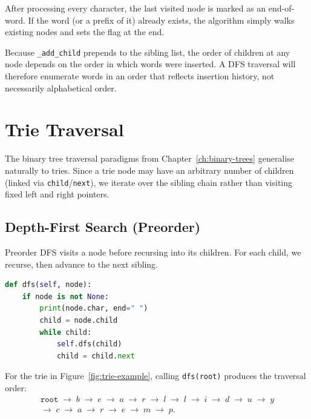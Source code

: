 \documentclass[11pt, a4paper, notitlepage]{report}
\theoremstyle{definition}
\theoremstyle{remark}
\theoremstyle{definition}
\begin{document}
After processing every character, the last visited node is marked as an
end-of-word.  If the word (or a prefix of it) already exists, the algorithm
simply walks existing nodes and sets the flag at the end.

\begin{warning}[title={Warning: Insertion Order Affects Sibling Order}]
Because \texttt{\_add\_child} prepends to the sibling list, the order of
children at any node depends on the order in which words were inserted.  A
DFS traversal will therefore enumerate words in an order that reflects
insertion history, not necessarily alphabetical order.
\end{warning}

\section{Trie Traversal}
\label{sec:trie-traversal}

The binary tree traversal paradigms from Chapter~\ref{ch:binary-trees}
generalise naturally to tries.  Since a trie node may have an arbitrary
number of children (linked via \texttt{child}/\texttt{next}), we iterate over
the sibling chain rather than visiting fixed left and right pointers.

\subsection{Depth-First Search (Preorder)}
\label{subsec:trie-dfs}

Preorder DFS visits a node before recursing into its children.  For each
child, we recurse, then advance to the next sibling.

\begin{lstlisting}[language=Python]
def dfs(self, node):
    if node is not None:
        print(node.char, end=" ")
        child = node.child
        while child:
            self.dfs(child)
            child = child.next
\end{lstlisting}

For the trie in Figure~\ref{fig:trie-example}, calling
\texttt{dfs(root)} produces the traversal order:
\begin{multline*}
  \texttt{root} \;\to\; b \;\to\; e \;\to\; a \;\to\; r \;\to\;
  l \;\to\; l \;\to\; i \;\to\; d \;\to\; u \;\to\; y \\
  \to\; c \;\to\; a \;\to\; r \;\to\; e \;\to\; m \;\to\; p.
\end{multline*}
\end{document}
